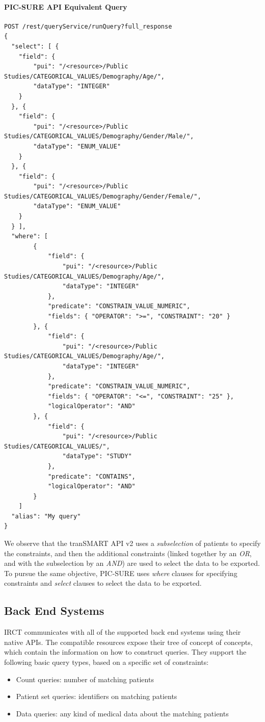 \paragraph{PIC-SURE API Equivalent Query}
\begin{verbatim}
POST /rest/queryService/runQuery?full_response
{
  "select": [ {
    "field": {
        "pui": "/<resource>/Public Studies/CATEGORICAL_VALUES/Demography/Age/",
        "dataType": "INTEGER"
    }
  }, {
    "field": {
        "pui": "/<resource>/Public Studies/CATEGORICAL_VALUES/Demography/Gender/Male/",
        "dataType": "ENUM_VALUE"
    }
  }, {
    "field": {
        "pui": "/<resource>/Public Studies/CATEGORICAL_VALUES/Demography/Gender/Female/",
        "dataType": "ENUM_VALUE"
    }
  } ],
  "where": [
        {
            "field": {
                "pui": "/<resource>/Public Studies/CATEGORICAL_VALUES/Demography/Age/",
                "dataType": "INTEGER"
            },
            "predicate": "CONSTRAIN_VALUE_NUMERIC",
            "fields": { "OPERATOR": ">=", "CONSTRAINT": "20" }
        }, {
            "field": {
                "pui": "/<resource>/Public Studies/CATEGORICAL_VALUES/Demography/Age/",
                "dataType": "INTEGER"
            },
            "predicate": "CONSTRAIN_VALUE_NUMERIC",
            "fields": { "OPERATOR": "<=", "CONSTRAINT": "25" },
            "logicalOperator": "AND"
        }, {
            "field": {
                "pui": "/<resource>/Public Studies/CATEGORICAL_VALUES/",
                "dataType": "STUDY"
            },
            "predicate": "CONTAINS",
            "logicalOperator": "AND"
        }
    ]
  "alias": "My query"
}
\end{verbatim}

We observe that the tranSMART API v2 uses a \emph{subselection} of patients to specify the constraints, and then the additional constraints (linked together by an \emph{OR}, and with the subselection by an \emph{AND}) are used to select the data to be exported.
To pursue the same objective, PIC-SURE uses \emph{where} clauses for specifying constraints and \emph{select} clauses to select the data to be exported.


\subsection{Back End Systems}

IRCT communicates with all of the supported back end systems using their native APIs.
The compatible resources expose their tree of concept of concepts, which contain the information on how to construct queries.
They support the following basic query types, based on a specific set of constraints:
\begin{itemize}
    \item Count queries: number of matching patients
    \item Patient set queries: identifiers on matching patients
    \item Data queries: any kind of medical data about the matching patients
\end{itemize}

